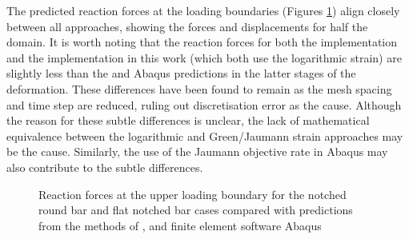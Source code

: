 \documentclass[sn-mathphys,Numbered]{sn-jnl}%
\begin{document}
The predicted reaction forces at the loading boundaries (Figures \ref{fig:plastic_forces}) align closely between all approaches, showing the forces and displacements for half the domain.
It is worth noting that the reaction forces for both the \citet{clancy_improving_2019} implementation and the implementation in this work (which both use the logarithmic strain) are slightly less than the \citet{cardiff_lagrangian_2017}  and Abaqus predictions in the latter stages of the deformation.
These differences have been found to remain as the mesh spacing and time step are reduced, ruling out discretisation error as the cause.
Although the reason for these subtle differences is unclear, the lack of mathematical equivalence between the logarithmic and Green/Jaumann strain approaches may be the cause.
Similarly, the use of the Jaumann objective rate in Abaqus \cite{soyarslan_finite_2010} may also contribute to the subtle differences.
\begin{figure}[htbp]
	\centering
		\caption{Reaction forces at the upper loading boundary for the notched round bar and flat notched bar cases compared with predictions from the methods of \citet{cardiff_lagrangian_2017}, \citet{clancy_improving_2019} and finite element software Abaqus}
	\label{fig:plastic_forces}
\end{figure}
\FloatBarrier
\end{document}
